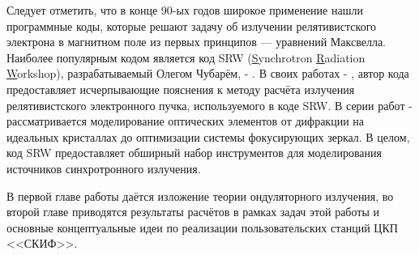 Следует отметить, что в конце 90-ых годов широкое применение нашли программные коды, которые решают задачу об излучении релятивистского электрона в магнитном поле из первых принципов --- уравнений Максвелла. Наиболее популярным кодом является код SRW (\underline{S}ynchrotron \underline{R}adiation \underline{W}orkshop), разрабатываемый Олегом Чубарём, \cite{SRW} - \cite{chubar1998proceedings}. В своих работах \cite{chubar1998accurate} - \cite{chubar2002physical}, автор кода предоставляет исчерпывающие пояснения к методу расчёта излучения релятивистского электронного пучка, используемого в коде SRW. В серии работ \cite{chubar2001wavefront} -%
\cite{idir2017alignment} рассматривается моделирование оптических элементов от дифракции на идеальных кристаллах до оптимизации системы фокусирующих зеркал. В целом, код SRW предоставляет обширный набор инструментов для моделирования источников синхротронного излучения. 

В первой главе работы даётся изложение теории ондуляторного излучения,
во второй главе приводятся результаты расчётов в рамках задач этой работы и основные концептуальные идеи по реализации пользовательских станций ЦКП <<СКИФ>>.


